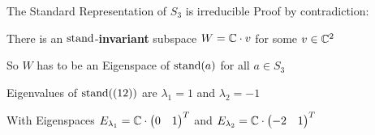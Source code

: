 \begin{frame}{The Standard Representation of $S_3$ is irreducible}
    \large
    Proof by contradiction:

    There is an $\operatorname{stand}$-\textbf{invariant} subspace $W = \mathbb{C} \cdot v$ for some $v \in \mathbb{C}^2$
    
    \pause
    So $W$ has to be an Eigenspace of $\operatorname{stand}(a)$ for all $a \in S_3$

    \pause
    \vspace{1em}
    Eigenvalues of $\operatorname{stand}((12))$ are $\lambda_1 = 1$ and $\lambda_2 = -1$

    \pause
    With Eigenspaces $E_{\lambda_1} = \mathbb{C} \cdot \begin{pmatrix}
        0 & 1
    \end{pmatrix}^T$ and $E_{\lambda_2} = \mathbb{C} \cdot \begin{pmatrix}
        -2 & 1
    \end{pmatrix}^T$


\end{frame}
